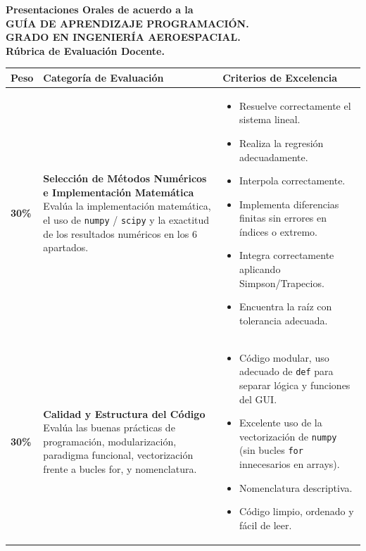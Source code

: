 \documentclass[11pt, a4paper]{article}
\begin{document}
\begin{center}
	\LARGE \textbf{Presentaciones Orales de acuerdo a la \\ GUÍA DE APRENDIZAJE
		PROGRAMACIÓN. \\ GRADO EN INGENIERÍA AEROESPACIAL.} \\
	\LARGE \textbf{Rúbrica de Evaluación Docente.}
\end{center}
\vspace{0.5cm}

\noindent
\begin{tabularx}{\textwidth}{|p{1cm}|p{6.5cm}|p{10.2cm}|}
	\toprule
	\textbf{Peso} & \textbf{Categoría de Evaluación} & \textbf{Criterios de Excelencia}  \\
	\midrule
	\textbf{30\%} & \textbf{Selección de Métodos Numéricos e Implementación Matemática} \newline \small Evalúa la implementación matemática, el uso de \texttt{numpy} / \texttt{scipy} y la exactitud de los resultados numéricos en los 6 apartados. 
	& \begin{itemize}[leftmargin=*, nosep]
		\item Resuelve correctamente el sistema lineal.
		\item Realiza la regresión adecuadamente.
		\item Interpola correctamente.
		\item Implementa diferencias finitas sin errores en índices o extremo.
		\item Integra correctamente aplicando Simpson/Trapecios.
		\item Encuentra la raíz  con tolerancia adecuada.
	\end{itemize} \\
	\midrule
	\textbf{30\%} & \textbf{Calidad y Estructura del Código} \newline \small Evalúa las buenas prácticas de programación, modularización, paradigma funcional, vectorización frente a bucles for, y nomenclatura.
	& \begin{itemize}[leftmargin=*, nosep]
		\item Código modular, uso adecuado de \texttt{def} para separar lógica y funciones del GUI.
		\item Excelente uso de la vectorización de \texttt{numpy} (sin bucles \texttt{for} innecesarios en arrays).
		\item Nomenclatura descriptiva.
		\item Código limpio, ordenado y fácil de leer.
	\end{itemize}  \\

\end{tabularx}
\end{document}
